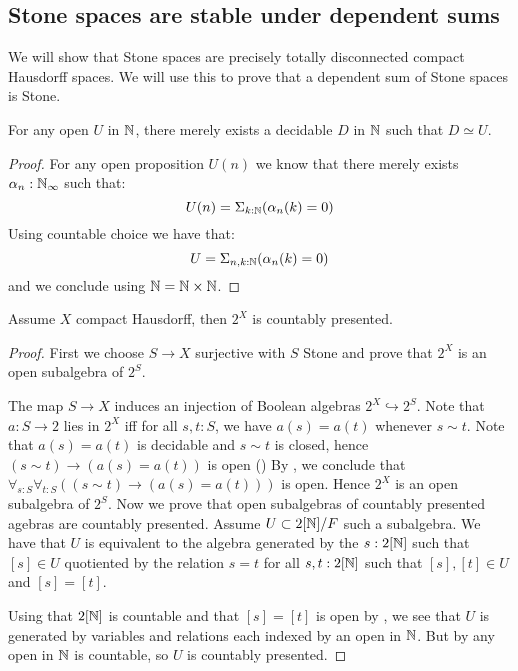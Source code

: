 \subsection{Stone spaces are stable under dependent sums}
We will show that Stone spaces are precisely totally disconnected compact Hausdorff spaces. 
We will use this to prove that a dependent sum of Stone spaces is Stone.

\begin{lemma}\label{OpenInNAreDecidableInN}
For any open $U$ in $\mathbb{N}$, there merely exists a decidable $D$ in $\mathbb{N}$ such that $D\simeq U$.
\end{lemma}

\begin{proof}
For any open proposition $U(n)$ we know that there merely exists $\alpha_n:\mathbb{N}_\infty$ such that:
$$ U(n) = \Sigma_{k:\mathbb{N}}(\alpha_n(k)=0)$$
Using countable choice we have that:
$$ U = \Sigma_{n,k:\mathbb{N}}(\alpha_n(k)=0)$$
and we conclude using $\mathbb{N}=\mathbb{N}\times\mathbb{N}$.
\end{proof}

\begin{lemma}\label{AlgebraCompactHausdorffCountablyPresented}
Assume $X$ compact Hausdorff, then $2^X$ is countably presented.
\end{lemma}

\begin{proof}
First we choose $S\to X$ surjective with $S$ Stone and prove that $2^X$ is an open subalgebra of $2^S$.

 The map $S\to X$ induces an injection of Boolean algebras $2^X \hookrightarrow 2^S$.
  Note that $a:S\to 2$ lies in $2^X$ iff for all $s,t:S$, we have $a(s) = a(t)$ whenever $s\sim t$.
  Note that $a(s) = a(t)$ is decidable and $s\sim t$ is closed, hence 
  $(s\sim t) \to (a(s) = a(t))$ is open ()
  By , we conclude that 
  $\forall_{s:S} \forall_{t:S} ((s\sim t) \to (a(s) = a(t)))$ is open. 
  Hence $2^X$ is an open subalgebra of $2^S$. 
Now we prove that open subalgebras of countably presented agebras are countably presented. Assume $U\subset 2[\mathbb{N}] / F$ such a subalgebra. We have that $U$ is equivalent to the algebra generated by the $s:2[\mathbb{N}]$ such that $[s]\in U$ quotiented by the relation $s=t$ for all $s,t:2[\mathbb{N}]$ such that $[s],[t]\in U$ and $[s]=[t]$.

Using that $2[\mathbb{N}]$ is countable and that $[s]=[t]$ is open by , we see that $U$ is generated by variables and relations each indexed by an open in $\mathbb{N}$. But by  any open in $\mathbb{N}$ is countable, so $U$ is countably presented.
\end{proof}

